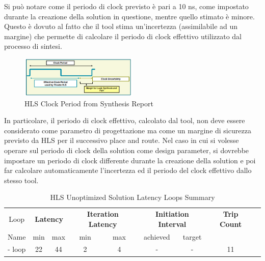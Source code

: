 Si può notare come il periodo di clock previsto è pari a 10 ns, come impostato durante la creazione della solution in questione, mentre quello stimato è minore. Questo è dovuto al fatto che il tool stima un'incertezza (assimilabile ad un margine) che permette di calcolare il periodo di clock effettivo utilizzato dal processo di sintesi.
\begin{figure}[H]
    \centering
    \includegraphics[width=0.5\textwidth]{solutions/unoptimized/clockperiod.png}
    \caption{HLS Clock Period from Synthesis Report}
\end{figure}

In particolare, il periodo di clock effettivo, calcolato dal tool, non deve essere considerato come parametro di progettazione ma come un margine di sicurezza previsto da HLS per il successivo place and route. Nel caso in cui si volesse operare sul periodo di clock della solution come design parameter, si dovrebbe impostare un periodo di clock differente durante la creazione della solution e poi far calcolare automaticamente l'incertezza ed il periodo del clock effettivo dallo stesso tool.

\begin{table}[H]
    \centering
    \begin{tabular}{|c|c|c|c|c|c|c|c|c|}
        \hline
        \multicolumn{1}{|c|}{Loop} & \multicolumn{2}{|c|}{\textbf{Latency}} & \multicolumn{2}{c|}{\textbf{Iteration Latency}} & \multicolumn{2}{c|}{\textbf{Initiation Interval}} & \multicolumn{1}{c|}{\textbf{Trip Count}}  \\
        Name & min & max & min & max & achieved & target &  \\
        \hline
        - loop & 22 & 44 & 2 & 4 & - & - & 11 \\
        \hline
    \end{tabular}
    \caption{HLS Unoptimized Solution Latency Loops Summary }
    \label{tab:hls-unoptimized-solution-loop-summary}
\end{table}

